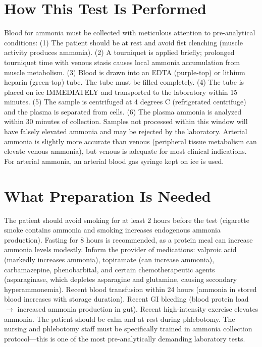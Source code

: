 \section*{How This Test Is Performed}
Blood for ammonia must be collected with meticulous attention to pre-analytical conditions: (1) The patient should be at rest and avoid fist clenching (muscle activity produces ammonia). (2) A tourniquet is applied briefly; prolonged tourniquet time with venous stasis causes local ammonia accumulation from muscle metabolism. (3) Blood is drawn into an EDTA (purple-top) or lithium heparin (green-top) tube. The tube must be filled completely. (4) The tube is placed on ice IMMEDIATELY and transported to the laboratory within 15 minutes. (5) The sample is centrifuged at 4 degrees C (refrigerated centrifuge) and the plasma is separated from cells. (6) The plasma ammonia is analyzed within 30 minutes of collection. Samples not processed within this window will have falsely elevated ammonia and may be rejected by the laboratory. Arterial ammonia is slightly more accurate than venous (peripheral tissue metabolism can elevate venous ammonia), but venous is adequate for most clinical indications. For arterial ammonia, an arterial blood gas syringe kept on ice is used.

\section*{What Preparation Is Needed}
The patient should avoid smoking for at least 2 hours before the test (cigarette smoke contains ammonia and smoking increases endogenous ammonia production). Fasting for 8 hours is recommended, as a protein meal can increase ammonia levels modestly. Inform the provider of medications: valproic acid (markedly increases ammonia), topiramate (can increase ammonia), carbamazepine, phenobarbital, and certain chemotherapeutic agents (asparaginase, which depletes asparagine and glutamine, causing secondary hyperammonemia). Recent blood transfusion within 24 hours (ammonia in stored blood increases with storage duration). Recent GI bleeding (blood protein load $\rightarrow$ increased ammonia production in gut). Recent high-intensity exercise elevates ammonia. The patient should be calm and at rest during phlebotomy. The nursing and phlebotomy staff must be specifically trained in ammonia collection protocol---this is one of the most pre-analytically demanding laboratory tests.

